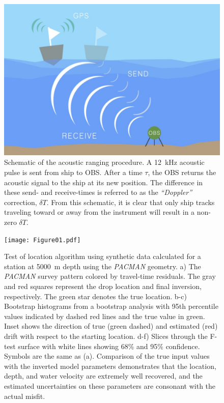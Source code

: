 \begin{figure}[h]
\includegraphics[trim=0cm 0cm 0cm 0cm,clip=true,width=\columnwidth]{OBS_Illustration.jpg}
\caption{Schematic of the acoustic ranging procedure. A 12~kHz acoustic pulse is sent from ship to OBS. After a time $\tau$, the OBS returns the acoustic signal to the ship at its new position. The difference in these send- and receive-times is referred to as the \textit{``Doppler''} correction, $\delta T$. From this schematic, it is clear that only ship tracks traveling toward or away from the instrument will result in a non-zero $\delta T$.}
\label{fig:cartoon}
\end{figure}

\newpage

\begin{figure}[h]
\texttt{[image: Figure01.pdf]}
\caption{Test of location algorithm using synthetic data calculated for a station at 5000~m depth using the \textit{PACMAN} geometry. a) The \textit{PACMAN} survey pattern colored by travel-time residuals. The gray and red squares represent the drop location and final inversion, respectively. The green star denotes the true location. b-c) Bootstrap histograms from a bootstrap analysis with 95th percentile values indicated by dashed red lines and the true value in green. Inset shows the direction of true (green dashed) and estimated (red) drift with respect to the starting location. d-f) Slices through the F-test surface with white lines showing 68\% and 95\% confidence. Symbols are the same as (a). Comparison of the true input values with the inverted model parameters demonstrates that the location, depth, and water velocity are extremely well recovered, and the estimated uncertainties on these parameters are consonant with the actual misfit.}
\label{fig:one_sta_synth}
\end{figure}

